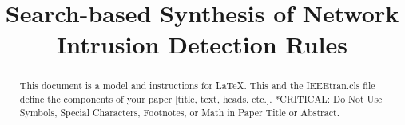 \documentclass[conference]{IEEEtran}
\begin{document}
\title{Search-based Synthesis of Network Intrusion Detection Rules}



\maketitle

\begin{abstract}
This document is a model and instructions for \LaTeX.
This and the IEEEtran.cls file define the components of your paper [title, text, heads, etc.]. *CRITICAL: Do Not Use Symbols, Special Characters, Footnotes, 
or Math in Paper Title or Abstract.
\end{abstract}
\end{document}
